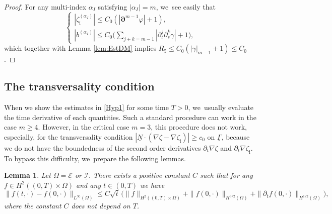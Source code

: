 \documentclass[JEP,XML,SOM,Unicode,NoFloatCountersInSection,published]{cedram}
\newcommand{\dt}{\partial_t}
\newcommand{\cI}{{\mathcal I}}
\newcommand{\cE}{{\mathcal E}}
\newcommand{\ul}[1]{\underline{#1}}
\newcommand{\itGamma}{\mathit{\Gamma}}
\newtheorem{lemma}[theorem]{Lemma}
\theoremstyle{definition}
\begin{document}
\begin{proof}
For any multi-index $\alpha_I$ satisfying $|\alpha_I|=m$, we~see easily that
\[
\begin{cases}
|\zeta_\mathrm{i}^{(\alpha_I)}| \leq C_0(|\bm{\partial}^{m-1}\varphi|+1), \\
|b^{(\alpha_I)}| \leq C_0 \bigl(\sum_{j+k=m-1}|\dt^j\partial_s^k\gamma| +1\bigr),
\end{cases}
\]
which together with Lemma \ref{lem:EstDM} implies $R_5 \leq C_0(|\gamma|_{m-1}+1)\leq C_0$.
\end{proof}

\subsection{The transversality condition}\label{secttransv}
When we show the estimates in \eqref{Hyp1} for some time $T>0$, we~usually evaluate the time derivative of each quantities.
Such a standard procedure can work in the case $m\geq4$.
However, in the critical case $m=3$, this procedure does not work, especially, for the transversality condition
\hbox{$|\ul{N}\cdot(\nabla\zeta-\nabla\zeta_\mathrm{i})| \geq c_0$} on $\ul{\itGamma}$,
because we do not have the boundedness of the second order derivatives $\dt\nabla\zeta$ and $\dt\nabla\zeta_\mathrm{i}$.
To bypass this difficulty, we~prepare the following lemmas.

\begin{lemma}\label{lem:Embedding1}
Let $\Omega=\ul{\cE}$ or $\ul{\cI}$.
There exists a positive constant $C$ such that for any $f\in H^2((0,T)\times\Omega)$
and any $t\in(0,T)$ we have
\[
\|f(t,\cdot)-f(0,\cdot)\|_{L^\infty(\Omega)}
\leq C\sqrt{t}\,\bigl(\|f\|_{H^2((0,T)\times\Omega)} + \|f(0,\cdot)\|_{H^{3/2}(\Omega)} + \|\dt f(0,\cdot)\|_{H^{1/2}(\Omega)} \bigr),
\]
where the constant $C$ does not depend on $T$.
\end{lemma}
\end{document}
